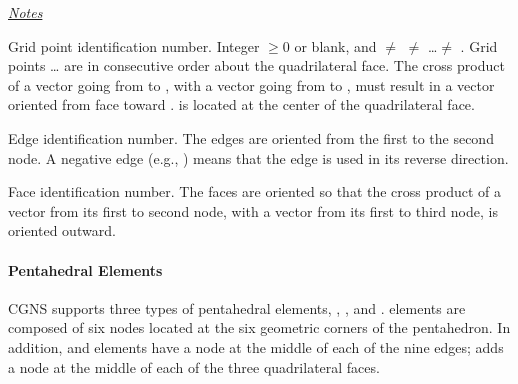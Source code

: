 {{{\uline{\textit{Notes}}%
\begin{Ventryi}{}
   \item [\fort{N1,\ldots,N14}]
         Grid point identification number.
         Integer $\ge 0$ or blank, and  $\ne$ 
         $\ne$ \ldots $\ne$ .
         Grid points \ldots{} are in consecutive order about
         the quadrilateral face.
         The cross product of a vector going from  to ,
         with a vector going from  to , must result in a
         vector oriented from face  toward .
          is located at the center of the quadrilateral face.
   \item [\fort{E1,\ldots,E8}]
         Edge identification number.
         The edges are oriented from the first to the second node.
         A negative edge (e.g., ) means that the edge is used in
         its reverse direction.
   \item [\fort{F1,\ldots,F5}]
         Face identification number.
         The faces are oriented so that the cross product of a vector
         from its first to second node, with a vector from its first to
         third node, is oriented outward.
\end{Ventryi}

\paragraph{Pentahedral Elements}
CGNS supports three types of pentahedral elements, ,
, and .
 elements are composed of six nodes located at the
six geometric corners of the pentahedron.
In addition,  and  elements have a node
at the middle of each of the nine edges;  adds a
node at the middle of each of the three quadrilateral faces.

}}}

